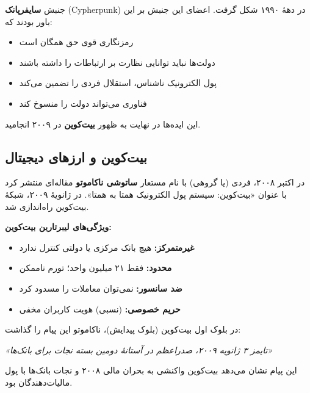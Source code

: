 جنبش \textbf{سایفرپانک} (Cypherpunk) در دههٔ ۱۹۹۰ شکل گرفت. اعضای این جنبش بر این باور بودند که:

\begin{itemize}
    \item رمزنگاری قوی حق همگان است
    \item دولت‌ها نباید توانایی نظارت بر ارتباطات را داشته باشند
    \item پول الکترونیک ناشناس، استقلال فردی را تضمین می‌کند
    \item فناوری می‌تواند دولت را منسوخ کند
\end{itemize}

این ایده‌ها در نهایت به ظهور \textbf{بیت‌کوین} در ۲۰۰۹ انجامید.

\subsection{بیت‌کوین و ارزهای دیجیتال}


در اکتبر ۲۰۰۸، فردی (یا گروهی) با نام مستعار \textbf{ساتوشی ناکاموتو} مقاله‌ای منتشر کرد با عنوان «بیت‌کوین: سیستم پول الکترونیک همتا به همتا». در ژانویهٔ ۲۰۰۹، شبکهٔ بیت‌کوین راه‌اندازی شد.

\textbf{ویژگی‌های لیبرتارین بیت‌کوین:}
\begin{itemize}
    \item \textbf{غیرمتمرکز:} هیچ بانک مرکزی یا دولتی کنترل ندارد
    \item \textbf{محدود:} فقط ۲۱ میلیون واحد؛ تورم ناممکن
    \item \textbf{ضد سانسور:} نمی‌توان معاملات را مسدود کرد
    \item \textbf{حریم خصوصی:} (نسبی) هویت کاربران مخفی
\end{itemize}

در بلوک اول بیت‌کوین (بلوک پیدایش)، ناکاموتو این پیام را گذاشت:

\textit{«تایمز ۳ ژانویه ۲۰۰۹، صدراعظم در آستانهٔ دومین بسته نجات برای بانک‌ها»}

این پیام نشان می‌دهد بیت‌کوین واکنشی به بحران مالی ۲۰۰۸ و نجات بانک‌ها با پول مالیات‌دهندگان بود.

